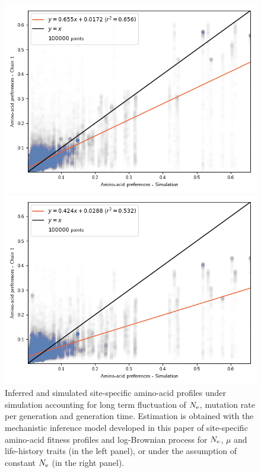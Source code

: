 \documentclass{article}
\begin{document}
	\begin{figure}[H]
		\centering
		\begin{minipage}{0.49\linewidth}
			\includegraphics[width=\linewidth, page=1]{simulations/BranchWise_SimuDiv_SiteMutSelBranchNe_ProfileCorrelation.png}
		\end{minipage} \hfill
		\begin{minipage}{0.49\linewidth}
			\includegraphics[width=\linewidth, page=1]{simulations/BranchWise_SimuDiv_SiteMutSel_ProfileCorrelation.png}
		\end{minipage}
		\caption[Inferred site amino-acid profiles for \texttt{SimuDiv}]{
		Inferred and simulated site-specific amino-acid profiles under simulation accounting for long term fluctuation of $N_{\text{e}}$, mutation rate per generation and generation time.
		Estimation is obtained with the mechanistic inference model developed in this paper of site-specific amino-acid fitness profiles and log-Brownian process for $N_{\text{e}}$, $\mu$ and life-history traits (in the left panel), or under the assumption of constant $N_{\text{e}}$ (in the right panel).
		}
	\end{figure}
\end{document}

